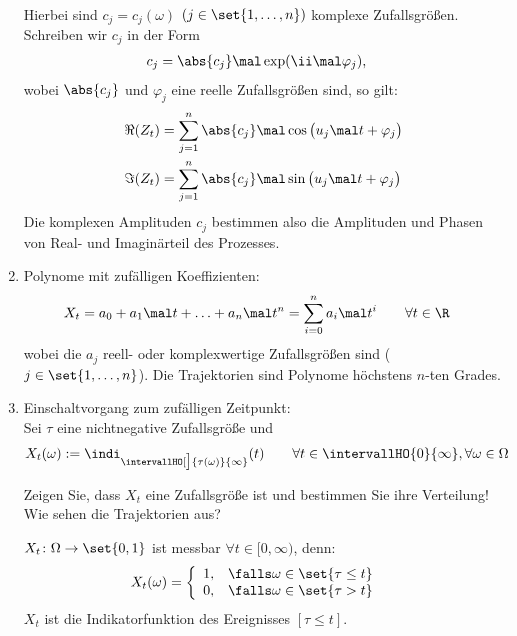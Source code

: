 \begin{beispiel}
\begin{enumerate}[label=(\alph*)]
\begin{align*}
		\end{align*}
        Hierbei sind $c_j=c_j(\omega)$ $(j\in\set{1,\ldots,n})$ komplexe Zufallsgrößen.
		Schreiben wir $c_j$ in der Form
		\begin{align*}
			c_j&=\abs{c_j}\mal\exp(\ii\mal\varphi_j),
		\end{align*}
		wobei $\abs{c_j}$ und $\varphi_j$ eine reelle Zufallsgrößen sind, so gilt:
		\begin{align*}
			\Re(Z_t)&=\sum\limits_{j=1}^n\abs{c_j}\mal\cos\big(u_j\mal t+\varphi_j\big)\\
			\Im(Z_t)&=\sum\limits_{j=1}^n\abs{c_j}\mal\sin\big(u_j\mal t+\varphi_j\big)
		\end{align*}
		Die komplexen Amplituden $c_j$ bestimmen also die Amplituden und Phasen von Real- und Imaginärteil des Prozesses.
		\item Polynome mit zufälligen Koeffizienten:\label{beisp:1.3.3(c)}
		\begin{align*}
			X_t&=a_0+a_1\mal t+\ldots+a_n\mal t^n=\sum\limits_{i=0}^n a_i\mal t^i
			\qquad\forall t\in\R
		\end{align*}
		wobei die $a_j$ reell- oder komplexwertige Zufallsgrößen sind ($j\in\set{1,\ldots,n}$).
		Die Trajektorien sind Polynome höchstens $n$-ten Grades.
		\item Einschaltvorgang zum zufälligen Zeitpunkt:\label{beisp:1.3.3(d)}\\
		Sei $\tau$ eine nichtnegative Zufallsgröße und 
		\begin{align*}
			X_t(\omega):=\indi_{\intervallHO[\big]{\tau(\omega)}{\infty}}(t)\qquad\forall t\in\intervallHO{0}{\infty},\forall\omega\in\Omega
		\end{align*}
		\begin{aufgabe}\enter
			Zeigen Sie, dass $X_t$ eine Zufallsgröße ist und bestimmen Sie ihre Verteilung!
			Wie sehen die Trajektorien aus?
		\end{aufgabe}
		\begin{lösung}
			$X_t\colon\Omega\to\set{0,1}$ ist messbar $\forall t\in[0,\infty)$, denn:
			\begin{align*}
				X_t(\omega)&=\left\lbrace\begin{array}{cl}
					1, &\falls \omega\in\set{\tau\leq t}\\
					0, &\falls \omega\in\set{\tau>t}
				\end{array}\right.
			\end{align*}
			$X_t$ ist die Indikatorfunktion des Ereignisses $[\tau\leq t]$.

\end{lösung}
\end{enumerate}
\end{beispiel}
